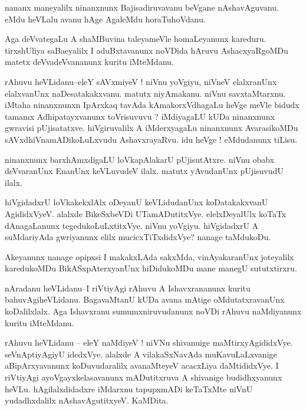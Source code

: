 \documentclass{article}
\begin{document}
\begin{mn}%
nananx maneyalilx ninanxnunx Bajisadiruvavanu beVgane nAshavAguvanu. eMdu heVLalu avanu hAge 
AgaleMdu horaTuhoVdanu.
\end{mn}

\begin{mn}%
Aga deVvategaLu A shaMBuvina taleyameVle homaLeyanunx kareduru. tirxshUliya saBaeyalilx I 
aduBxtavanunx noVDida hAruvu AshacxyaRgoMDu matetx deVvadeVvananunx kuritu iMteMdanu.
\end{mn}

\begin{mn}%
rAhuvu heVLidanu--eleY sAVxmiyeV ! niVnu yoVgiyu, niVneV elalxranUnx elalxvanUnx 
naDesatakakxvanu. matutx niyAmakanu. niVnu savxtaMtarxnu. iMtaha ninanxnunxn IpArxkaq	
tavAda kAmakorxVdhagaLu heVge meVle bidudx tamamx Adhipatayxvanunx toVrisuvuvu ? iMdiyagaLU 
kUDa ninanxnunx gwravisi pUjisatatxve. hiVgiruvalilx A iMderxyagaLu ninanxnunx AvarasikoMDu 
sAVxdhiVnamADikoLuLxvudu AshavxrayaRvu. idu heVge ! eMdudanunx tiLisu.
\end{mn}

\begin{mn}%
ninanxnunx barxhAmxdigaLU loVkapAlakarU pUjisutAtxre. niVnu obabx deVvaranUnx EnanUnx 
keVLuvudeV ilalx. matutx yAvudanUnx pUjisuvudU ilalx.
\end{mn}

\begin{mn}%
hiVgidadxrU loVkakekxlAlx oDeyanU keVLidudanUnx koDatakakxvanU AgididxVyeV. alalxde 
BikeSxbeVDi UTamADutitxVye. elelxDeyalUlx koTaTx dAnagaLanunx tegedukoLuLxtitxVye. niVnu 
yoVgiyu. hiVgidadxrU A suMdariyAda gwriyanunx elilx mucicxTiTxdidxVye? nanage taMdukoDu. 
\end{mn}

\begin{mn}%
Akeyanunx nanage opipxsi I makakxLAda sakxMda, vinAyakaranUnx joteyalilx karedukoMDu 
BikASxpAterxyanUnx hiDidukoMDu mane manegU sututxtirxru.
\end{mn}

\begin{mn}%
nAradanu heVLidanu--I riVtiyAgi rAhuvu A Ishavxrananunx kuritu bahuvAgiheVLidanu. 
BagavaMtanU kUDa avana mAtige oMdutatxravanUnx koDalilxlalx. Aga Ishavxranu 
sumumxniruvudanunx noVDi rAhuvu naMdiyanunx kuritu iMteMdanu.
\end{mn}

\begin{mn}%
rAhuvu heVLidanu -- eleY naMdiyeV ! niVNu shivanuige maMtirxyAgididxVye. seVnAptiyAgiyU 
idedxVye. alalxde A vilakaSxNavAda muKavuLaLxvanige aBipArxyavanunx koDuvudaralilx 
avanaMteyeV acacxLiya daMtididxVye. I riVtiyAgi ayoVgayxkelasavanunx mADutitxruva A 
shivanige budidhxyanunx heVLu. hAgilalxdidadxre iMdarxnu tapupxmADi keTaTxMte niVnU 
yudadhxdalilx nAshavAgutitxyeV. KaMDita.
\end{mn}
\end{document}
